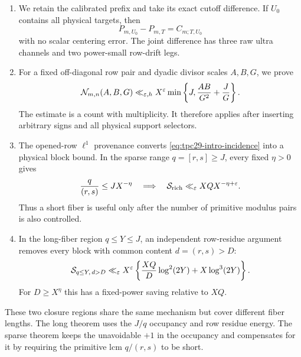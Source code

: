 \begin{enumerate}[label=\textup{(\roman*)}]
 \item We retain the calibrated prefix and take its exact cutoff
 difference.  If $U_0$ contains all physical targets, then
 \begin{equation}
  P_{m,U_0}-P_{m,T}=C_{m;T,U_0}
  \label{eq:tpc29-intro-cutoff-difference}
 \end{equation}
 with no scalar centering error.  The joint difference has three raw
 ultra channels and two power-small row-drift legs.

 \item For a fixed off-diagonal row pair and dyadic divisor scales
 $A,B,G$, we prove
 \begin{equation}
  \mathcal N_{m,n}(A,B,G)
  \ll_{\varepsilon,h}X^\varepsilon
  \min\left\{J,\frac{AB}{G^2}+\frac JG\right\}.
  \label{eq:tpc29-intro-incidence}
 \end{equation}
 The estimate is a count with multiplicity.  It therefore applies
 after inserting arbitrary signs and all physical support selectors.

 \item The opened-row $\ell^1$ provenance converts
 \eqref{eq:tpc29-intro-incidence} into a physical block bound.  In the
 sparse range $q=[r,s]\ge J$, every fixed $\eta>0$ gives
 \begin{equation}
  \frac{q}{(r,s)}\le JX^{-\eta}
  \quad\Longrightarrow\quad
  \mathcal S_{\rm rich}\ll_\varepsilon XQX^{-\eta+\varepsilon}.
  \label{eq:tpc29-intro-sparse-wedge}
 \end{equation}
 Thus a short fiber is useful only after the number of primitive
 modulus pairs is also controlled.

 \item In the long-fiber region $q\le Y\le J$, an independent
 row-residue argument removes every block with common content
 $d=(r,s)>D$:
 \begin{equation}
  \mathcal S_{q\le Y,\,d>D}
  \ll_\varepsilon X^\varepsilon
  \left\{
   \frac{XQ}{D}\log^2(2Y)+X\log^3(2Y)
  \right\}.
  \label{eq:tpc29-intro-long-pruning}
 \end{equation}
 For $D\ge X^\eta$ this has a fixed-power saving relative to $XQ$.
\end{enumerate}

These two closure regions share the same mechanism but cover different
fiber lengths.  The long theorem uses the $J/q$ occupancy and row
residue energy.  The sparse theorem keeps the unavoidable $+1$ in the
occupancy and compensates for it by requiring the primitive lcm
$q/(r,s)$ to be short.


